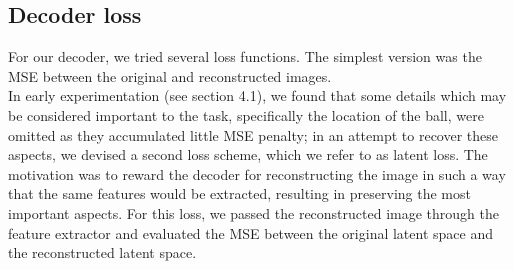 \subsection{Decoder loss}\label{sub:Decoder_Loss}
    For our decoder, we tried several loss functions. The simplest version was
    the MSE between the original and reconstructed images. \\
    In early experimentation (see section 4.1), we found that some details which
    may be considered important to the task, specifically the location of the
    ball, were omitted as they accumulated little MSE penalty; in an attempt to
    recover these aspects, we devised a second loss scheme, which we refer to as
    latent loss. The motivation was to reward the decoder for reconstructing the
    image in such a way that the same features would be extracted, resulting in
    preserving the most important aspects. For this loss, we passed the
    reconstructed image through the feature extractor and evaluated the MSE
    between the original latent space and the reconstructed latent space.